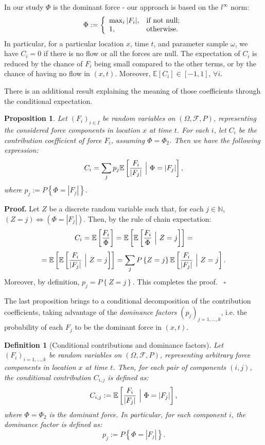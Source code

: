 \documentclass{article}
\newtheorem{definition}[theorem]{Definition}
\newtheorem{proposition}[theorem]{Proposition}
\newenvironment{proof}[1][Proof]{\noindent\textbf{#1.} }{\ $\square$}
\begin{document}
In our study $\Phi$ is the dominant force - our approach is based on the $l^\infty$ norm:
$$\Phi:=\left\{
    \begin{array}{ll}
      \max_i |F_i|, & \hbox{if not null;} \\
      1, & \hbox{otherwise.}
    \end{array}
  \right.$$
In particular, for a particular location $x$, time $t$, and parameter sample $\omega$, we have $C_i=0$ if there is no flow or all the forces are null. The expectation of $C_i$ is reduced by the chance of $F_i$ being small compared to the other terms, or by the chance of having no flow in $(x,t)$. Moreover, $\mathbb E[C_i]\in[-1,1]$, $\forall i$.

There is an additional result explaining the meaning of those coefficients through the conditional expectation.
\begin{proposition}
Let $(F_i)_{i\in I}$ be random variables on $(\Omega, \mathcal F, P)$, representing the considered force components in location $x$ at time $t$. For each $i$, let $C_i$ be the contribution coefficient of force $F_i$, assuming $\Phi=\Phi_2$. Then we have the following expression:
$$C_i=\sum_j p_j \mathbb E\left[\frac{F_i}{|F_j|}\ \Big{|}\ \Phi=|F_j|\right],$$
where $p_j:=P\left\{\Phi=|F_j|\right\}$.
\end{proposition}

\begin{proof}
Let $Z$ be a discrete random variable such that, for each $j\in\mathbb N$, $(Z=j) \Longleftrightarrow (\Phi=|F_j|)$. Then, by the rule of chain expectation:
$$C_i=\mathbb E\left[\frac{F_i}{\Phi}\right]=\mathbb E\left[\mathbb E\left[\frac{F_i}{\Phi}\ \Big{|}\ Z=j\right]\right]=$$
$$=\mathbb E\left[\mathbb E\left[\frac{F_i}{|F_j|}\ \Big{|}\ Z=j\right]\right]=\sum_j P\left\{Z=j\right\} \mathbb E\left[\frac{F_i}{|F_j|}\ \Big{|}\ Z=j\right].$$
Moreover, by definition, $p_j=P\left\{Z=j\right\}$. This completes the proof.
\end{proof}

The last proposition brings to a conditional decomposition of the contribution coefficients, taking advantage of the \emph{dominance factors} $(p_j)_{j=1,\dots, k}$, i.e. the probability of each $F_j$ to be the dominant force in $(x,t)$.

\begin{definition}[Conditional contributions and dominance factors]
Let $(F_i)_{i=1,\dots, k}$ be random variables on $(\Omega, \mathcal F, P)$, representing arbitrary force components in location $x$ at time $t$. Then, for each pair of components $(i,j)$, the conditional contribution $C_{i,j}$ is defined as:
$$C_{i,j}:=\mathbb E\left[\frac{F_i}{|F_j|}\ \Big{|}\ \Phi=|F_j|\right],$$
where $\Phi=\Phi_2$ is the dominant force. In particular, for each component $i$, the dominance factor is defined as:
$$p_j:=P\left\{\Phi=|F_j|\right\}.$$
\end{definition}

\newpage


\end{document}
